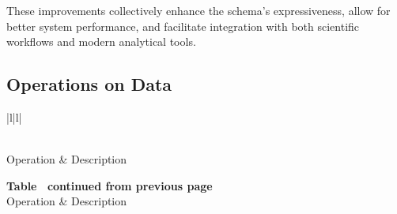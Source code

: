 These improvements collectively enhance the schema’s expressiveness, allow for better system performance, and facilitate integration with both scientific workflows and modern analytical tools.


\subsection{Operations on Data}

\begin{longtable}{|l|l|}
\caption{Extended Operations on Data} \label{tab:special-operations} \\
\hline
Operation & Description \\
\hline
\endfirsthead

%
{{\bfseries Table \thetable\ continued from previous page}} \\
\hline
Operation & Description \\
\hline
\endhead

\hline {} \\
\endfoot

\hline
\endlastfoot


\end{longtable}
